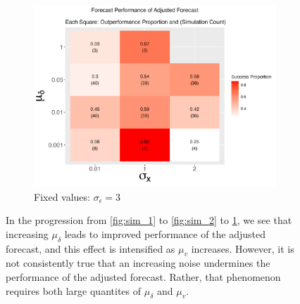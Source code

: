 \documentclass{uiucthesis2021}
\theoremstyle{definition}
\begin{document}
\begin{figure}[!h]
    \begin{subfigure}{.44\linewidth} 
      \centering
        \includegraphics[scale=.42]{simulation_plots/Nov27_160343_2024_mudelta_sigmax.png}
        \caption{Fixed values: $\sigma_{\epsilon}=3$}\label{fig:sim_3}
    \end{subfigure}
    
        \caption{In the progression from \ref{fig:sim_1} to \ref{fig:sim_2} to \ref{fig:sim_3}, we see that increasing $\mu_{\delta}$ leads to improved performance of the adjusted forecast, and this effect is intensified as $\mu_{v}$ increases.  However, it is not consistently true that an increasing noise undermines the performance of the adjusted forecast.  Rather, that phenomenon requires both large quantites of $\mu_{\delta}$ and $\mu_{v}$.}
        \label{fig:set_of_three_one}
      \end{figure}
    
\end{document}
